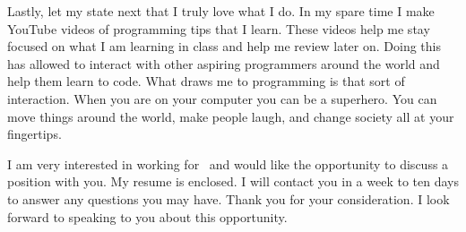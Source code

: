 \documentclass{my_cv}
\begin{document}
Lastly, let my state next that I truly love what I do.  In my spare time
I make YouTube videos of programming tips that I learn.  These videos
help me stay focused on what I am learning in class and help me review
later on.  Doing this has allowed to interact with other aspiring
programmers around the world and help them learn to code.  What draws me
to programming is that sort of interaction.  When you are on your
computer you can be a superhero.  You can move things around the world,
make people laugh, and change society all at your fingertips.

I am very interested in working for \companyName \  and would like the
opportunity to discuss a position with you.  My resume is enclosed. 
I will contact you in a week to ten days to answer any questions
you may have. Thank you for your consideration.  I look forward to
speaking to you about this opportunity. 

\makeletterclosing
\end{document}
